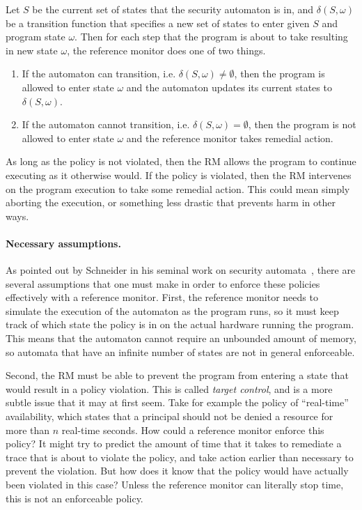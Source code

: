 \documentclass[11pt,twoside]{scrartcl}
\begin{document}
\begin{definition}
\label{def:sa}
Let $S$ be the current set of states that the security automaton is in, and $\delta(S,\omega)$ be a transition function that specifies a new set of states to enter given $S$ and program state $\omega$. Then for each step that the program is about to take resulting in new state $\omega$, the reference monitor  does one of two things.
\begin{enumerate}
\item If the automaton can transition, i.e. $\delta(S,\omega) \ne \emptyset$, then the program is allowed to enter state $\omega$ and the automaton updates its current states to $\delta(S,\omega)$.
\item If the automaton cannot transition, i.e. $\delta(S,\omega) = \emptyset$, then the program is not allowed to enter state $\omega$ and the reference monitor takes remedial action.
\end{enumerate}
\end{definition}

As long as the policy is not violated, then the RM allows the program to continue executing as it otherwise would. If the policy is violated, then the RM intervenes on the program execution to take some remedial action. This could mean simply aborting the execution, or something less drastic that prevents harm in other ways.

\paragraph{Necessary assumptions.} As pointed out by Schneider in his seminal work on security automata~\cite{Schneider2000}, there are several assumptions that one must make in order to enforce these policies effectively with a reference monitor. First, the reference monitor needs to simulate the execution of the automaton as the program runs, so it must keep track of which state the policy is in on the actual hardware running the program. This means that the automaton cannot require an unbounded amount of memory, so automata that have an infinite number of states are not in general enforceable.

Second, the RM must be able to prevent the program from entering a state that would result in a policy violation. This is called \emph{target control}, and is a more subtle issue that it may at first seem. Take for example the policy of ``real-time'' availability, which states that a principal should not be denied a resource for more than $n$ real-time seconds. How could a reference monitor enforce this policy? It might try to predict the amount of time that it takes to remediate a trace that is about to violate the policy, and take action earlier than necessary to prevent the violation. But how does it know that the policy would have actually been violated in this case? Unless the reference monitor can literally stop time, this is not an enforceable policy.
\end{document}

